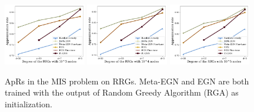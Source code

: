 \begin{figure}[h]
     \centering
         \includegraphics[width=0.32\textwidth]{iclr2023/img/exp/mis_10_3_ga.pdf}
     \hfill
         \includegraphics[width=0.32\textwidth]{iclr2023/img/exp/mis_10_4_ga.pdf}
     \hfill
         \includegraphics[width=0.32\textwidth]{iclr2023/img/exp/mis_10_5_ga.pdf}
     \vspace{-0.3cm}
        \caption{ApRs in the MIS problem on RRGs. %
        Meta-EGN and EGN are both trained with the output of Random Greedy Algorithm (RGA) as initialization.}
        \label{fig:mis_ga}\vspace{-0.3cm}
\end{figure}



